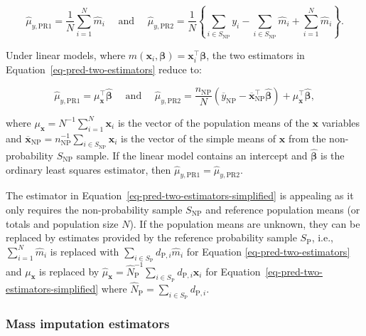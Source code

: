 \documentclass[
]{jss}
\begin{document}
\begin{equation}
\hat{\mu}_{y,\text{PR1}}=\frac{1}{N} \sum_{i=1}^N \hat{m}_i \quad \text { and } \quad \hat{\mu}_{y,\text{PR2}}=\frac{1}{N}\left\{\sum_{i \in S_{\text{NP}}} y_i-\sum_{i \in S_{\text{NP}}} \hat{m}_i+\sum_{i=1}^N \hat{m}_i\right\}.
\label{eq-pred-two-estimators}
\end{equation}

Under linear models, where
\(m(\boldsymbol{x}_i, \boldsymbol{\beta})=\boldsymbol{x}_i^{\top}\boldsymbol{\beta}\),
the two estimators in Equation~\ref{eq-pred-two-estimators} reduce to:

\begin{equation}
\hat{\mu}_{y,\text{PR1}}=\mu_{\boldsymbol{x}}^{\top} \hat{\boldsymbol{\beta}} \quad \text { and } \quad \hat{\mu}_{y,\text{PR2}}=\frac{n_{\text{NP}}}{N}\left(\overline{y}_{\text{NP}}-\overline{\boldsymbol{x}}_{\text{NP}}^{\top} \hat{\boldsymbol{\beta}}\right)+\mu_{\boldsymbol{x}}^{\top} \hat{\boldsymbol{\beta}},
\label{eq-pred-two-estimators-simplified}
\end{equation}

where \(\mu_{\boldsymbol{x}} = N^{-1}\sum_{i=1}^N\boldsymbol{x}_i\) is
the vector of the population means of the \(\boldsymbol{x}\) variables
and
\(\overline{\boldsymbol{x}}_{\text{NP}}=n_{\text{NP}}^{-1}\sum_{i \in S_{\text{NP}}}\boldsymbol{x}_i\)
is the vector of the simple means of \(\boldsymbol{x}\) from the
non-probability \(S_{\text{NP}}\) sample. If the linear model contains
an intercept and \(\hat{\boldsymbol{\beta}}\) is the ordinary least
squares estimator, then
\(\hat{\mu}_{y,\text{PR1}}=\hat{\mu}_{y,\text{PR2}}\).

The estimator in Equation~\ref{eq-pred-two-estimators-simplified} is
appealing as it only requires the non-probability sample
\(S_{\text{NP}}\) and reference population means (or totals and
population size \(N\)). If the population means are unknown, they can be
replaced by estimates provided by the reference probability sample
\(S_{\text{P}}\), i.e., \(\sum_{i=1}^N \hat{m}_i\) is replaced with
\(\sum_{i \in S_{\text{P}}} d_{\text{P},i}\hat{m}_i\) for Equation
\ref{eq-pred-two-estimators} and \(\mu_{\boldsymbol{x}}\) is replaced by
\(\hat{\mu}_{\boldsymbol{x}}=\hat{N}_{\text{P}}^{-1}\sum_{i \in S_{\text{P}}}d_{\text{P},i}\boldsymbol{x}_i\)
for Equation~\ref{eq-pred-two-estimators-simplified} where
\(\hat{N}_{\text{P}}=\sum_{i \in S_{\text{P}}}d_{\text{P},i}\).

\subsubsection{Mass imputation
estimators}\label{mass-imputation-estimators}
\end{document}
